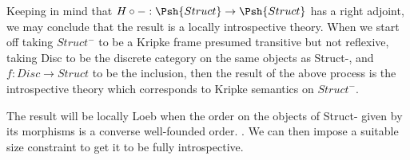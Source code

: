 Keeping in mind that $H \circ - : \Psh{Struct} \to \Psh{Struct}$ has a right adjoint, we may conclude that the result is a locally introspective theory. When we start off taking $Struct^-$ to be a Kripke frame presumed transitive but not reflexive, taking Disc to be the discrete category on the same objects as Struct-, and $f : Disc \to Struct$ to be the inclusion, then the result of the above process is the introspective theory which corresponds to Kripke semantics on $Struct^-$. 

The result will be locally Loeb when the order on the objects of Struct- given by its morphisms is a converse well-founded order. . We can then impose a suitable size constraint to get it to be fully introspective.

